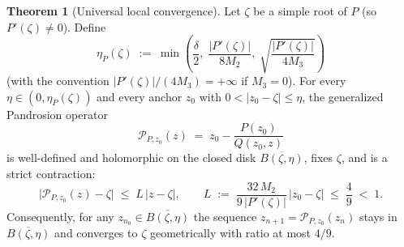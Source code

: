 \documentclass[11pt,a4paper]{article}
\theoremstyle{definition}
\newtheorem{theorem}{Theorem}[section]
\begin{document}
\begin{theorem}[Universal local convergence]
\label{thm:universal_local}
Let $\zeta$ be a simple root of $P$ (so $P'(\zeta) \neq 0$).  Define
\begin{equation}
  \label{eq:eta_def}
  \eta_P(\zeta) \;:=\; \min\!\left(\frac{\delta}{2},\; \frac{|P'(\zeta)|}{8 M_2},\; \sqrt{\frac{|P'(\zeta)|}{4 M_3}}\right)
\end{equation}
(with the convention $|P'(\zeta)|/(4M_3) = +\infty$ if $M_3 = 0$).  For every $\eta \in (0, \eta_P(\zeta))$ and every anchor $z_0$ with $0 < |z_0 - \zeta| \leq \eta$, the generalized Pandrosion operator
\[
  \mathcal{P}_{P,z_0}(z) \;=\; z_0 - \frac{P(z_0)}{Q(z_0, z)}
\]
is well-defined and holomorphic on the closed disk $\overline{B(\zeta, \eta)}$, fixes $\zeta$, and is a strict contraction:
\begin{equation}
  \label{eq:contraction_bound}
  \bigl|\mathcal{P}_{P,z_0}(z) - \zeta\bigr|
  \;\leq\;
  L\,|z - \zeta|,
  \qquad
  L \;:=\; \frac{32\, M_2}{9\,|P'(\zeta)|}\,|z_0 - \zeta| \;\leq\; \frac{4}{9} \;<\; 1.
\end{equation}
Consequently, for any $z_{n_0} \in \overline{B(\zeta, \eta)}$ the sequence $z_{n+1} = \mathcal{P}_{P,z_0}(z_n)$ stays in $\overline{B(\zeta, \eta)}$ and converges to $\zeta$ geometrically with ratio at most $4/9$.
\end{theorem}
\end{document}
